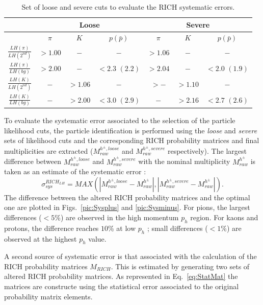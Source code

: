 \begin{table}[!h]
	\centering
	\begin{tabular}{ccccccc}
		\hline
		 & \multicolumn{3}{c}{Loose} & \multicolumn{3}{c}{Severe} \\
		\hline
		 & $\pi$ & $K$ & $p(\bar{p})$ & $\pi$ & $K$ & $p(\bar{p})$ \\
		\hline
		$\frac{LH(\pi)}{LH(2^{nd})}$ & $> 1.00$ & $-$ & $-$ & $>1.06$ & $-$ & $-$ \\
		$\frac{LH(\pi)}{LH(bg)}$ & $> 2.00$ & $-$ & $<2.3$ $(2.2)$ & $>2.04$ & $-$ & $<2.0$ $(1.9)$ \\
		$\frac{LH(K)}{LH(2^{nd})}$ & $-$ & $>1.06$ & $-$ & $>-$ & $>1.10$ & $-$ \\
		$\frac{LH(K)}{LH(bg)}$ & $-$ & $>2.00$ & $<3.0$ $(2.9)$ & $-$ & $>2.16$ & $<2.7$ $(2.6)$ \\
		\hline
	\end{tabular}
  \caption{Set of loose and severe cuts to evaluate the RICH systematic errors.}
  \label{tab:loose.severe}
\end{table}

To evaluate the systematic error associated to the selection of the particle likelihood cuts, the particle identification is performed using the \textit{loose}
and \textit{severe} sets of likelihood cuts and the corresponding RICH probability matrices and final multiplicities are extracted ($M^{h^{\pm},loose}_{raw}$
and $M^{h^{\pm},severe}_{raw}$ respectively). The largest difference between $M^{h^{\pm},loose}_{raw}$ and $M^{h^{\pm},severe}_{raw}$ with the nominal
multiplicity $M^{h^{\pm}}_{raw}$ is taken as an estimate of the systematic error :
%
\begin{equation}
  \sigma^{RICH_{LH}}_{sys} = MAX(|M^{h^{\pm},loose}_{raw}-M^{h^{\pm}}_{raw}|,|M^{h^{\pm},severe}_{raw}-M^{h^{\pm}}_{raw}|).
\end{equation}
%
The difference between the altered RICH probability matrices and the optimal one are plotted in Figs.~\ref{pic:Sysplus} and \ref{pic:Sysminus}. For pions, the largest differences
($<5$\%) are observed in the high momentum $p_h$ region. For kaons and protons, the difference reaches $10$\% at low $p_h$ ; small differences ($<1$\%) are observed at the
highest $p_h$ value.

A second source of systematic error is that associated with the calculation of the RICH probability matrices $M_{RICH}$. This is estimated by generating two sets of altered RICH probability matrices. As represented in Eq.~\ref{eq:StatMat} the matrices are constructe using the statistical error associated to the original probability matrix elements.

